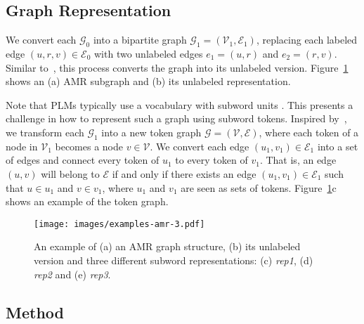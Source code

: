 \documentclass[11pt]{article}
\begin{document}
\subsection{Graph Representation}
\label{sec:graphrep}
We convert each $\mathcal{G}_0$ into a bipartite graph $\mathcal{G}_1 = (\mathcal{V}_1, \mathcal{E}_1)$, replacing each labeled edge $(u,r,v) \in \mathcal{E}_0$ with two unlabeled edges $e_1 = (u, r)$ and $e_2 = (r, v)$. Similar to~\citet{beck-etal-2018-graph}, this process converts the graph into its unlabeled version. Figure~\ref{fig:amrreps} shows an (a) AMR subgraph and (b) its unlabeled representation.

Note that PLMs typically use a vocabulary with subword units \cite{sennrich-etal-2016-neural}. This presents a challenge in how to represent such a graph using subword tokens. Inspired by~\citet{ribeiro2020modeling}, we transform each $\mathcal{G}_1$ into a new token graph $\mathcal{G} = (\mathcal{V}, \mathcal{E})$, where each token of a node in $\mathcal{V}_1$ becomes a node $v \in \mathcal{V}$. We convert each edge $ (u_1, v_1) \in \mathcal{E}_1$ into a set of edges and connect every token of $u_1$ to every token of $v_1$. That is, an edge $(u, v)$ will belong to $\mathcal{E}$ if and only if there exists an edge $ (u_1, v_1) \in \mathcal{E}_1$ such that $u \in u_1$ and $v \in v_1$, where $u_1$ and $v_1$ are seen as sets of tokens. Figure~\ref{fig:amrreps}c shows an example of the token graph.

\begin{figure}[t]
    \centering
    \texttt{[image: images/examples-amr-3.pdf]}
    \caption{An example of (a) an AMR graph structure, (b) its unlabeled version and three different subword representations: (c) \emph{rep1}, (d) \emph{rep2} and (e) \emph{rep3}.}
    \label{fig:amrreps}
\end{figure}



\subsection{Method}
\label{sec:method}
\end{document}
